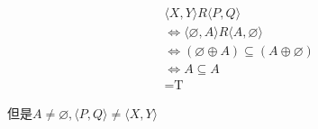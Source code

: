 \documentclass[12pt]{article}
\newenvironment{firstlayer}%
{\begin{list}{}{\renewcommand{\makelabel}[1]{\textbf{##1}.\hfil}
}}
{\end{list}}
\newenvironment{secondlayer}%
{\begin{list}{}{\renewcommand{\makelabel}[1]{(##1)\hfil}
}}
{\end{list}}
\begin{document}
\begin{CJK}{UTF8}{gbsn}
\begin{firstlayer}
\begin{secondlayer}
\begin{align*}
&\langle X,Y\rangle R\langle P,Q\rangle\\
&\Leftrightarrow \langle \varnothing,A\rangle R\langle A,\varnothing \rangle\\
&\Leftrightarrow (\varnothing \oplus A)\subseteq (A \oplus \varnothing) \\
&\Leftrightarrow A\subseteq A\\
&=\text{T}
\end{align*}

但是$A\neq \varnothing,\langle P,Q\rangle\neq \langle X,Y\rangle$
\end{secondlayer}
\end{firstlayer}


\end{CJK}
\end{document}
